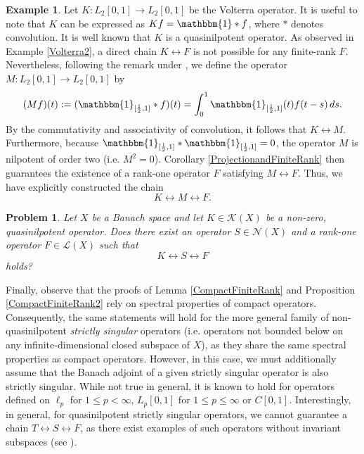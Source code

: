 \documentclass[a4paper,12pt]{article}
\newtheorem{problem}[thm]{Problem}
\theoremstyle{definition}
\newtheorem{example}[thm]{Example}
\numberwithin{equation}{section}
\numberwithin{thm}{section}
\begin{document}
\begin{example}
Let $K : L_2[0,1] \rightarrow L_2[0,1]$ be the Volterra operator. It is useful to note that $K$ can be expressed as $Kf = \mathbbm{1} \ast f$, where $\ast$ denotes convolution. It is well known that $K$ is a quasinilpotent operator. As observed in Example \ref{Volterra2}, a direct chain $K \leftrightarrow F$ is not possible for any finite-rank $F$. Nevertheless, following the remark under \cite[Lemma 2.6]{Ambrozie}, we define the operator $M : L_2[0,1] \rightarrow L_2[0,1]$ by
$$(Mf)(t) := (\mathbbm{1}_{[\frac{1}{2},1]} \ast f)(t) = \int_0^1 \mathbbm{1}_{[\frac{1}{2},1]}(t)f(t-s) \,ds.$$
By the commutativity and associativity of convolution, it follows that $K \leftrightarrow M$. Furthermore, because $\mathbbm{1}_{[\frac{1}{2},1]} \ast \mathbbm{1}_{[\frac{1}{2},1]} = 0$, the operator $M$ is nilpotent of order two (i.e. $M^2=0$). Corollary \ref{ProjectionandFiniteRank} then guarantees the existence of a rank-one operator $F$ satisfying $M \leftrightarrow F$. Thus, we have explicitly constructed the chain
$$K \leftrightarrow M \leftrightarrow F.$$
\end{example}

\begin{problem}
Let $X$ be a Banach space and let $K\in \mathcal{K}(X)$ be a non-zero, quasinilpotent operator. Does there exist an operator $S\in \mathcal{N}(X)$ and a rank-one operator $F\in \mathcal{L}(X)$ such that 
$$K\leftrightarrow S \leftrightarrow F$$
holds?
\end{problem}

Finally, observe that the proofs of Lemma \ref{CompactFiniteRank} and Proposition \ref{CompactFiniteRank2} rely on spectral properties of compact operators. Consequently, the same statements will hold for the more general family of non-quasinilpotent \textit{strictly singular} operators (i.e. operators not bounded below on any infinite-dimensional closed subspace of $X$), as they share the same spectral properties as compact operators. However, in this case, we must additionally assume that the Banach adjoint of a given strictly singular operator is also strictly singular. While not true in general, it is known to hold for operators defined on $\ell_p$ for $1\leq p<\infty$, $L_p[0,1]$ for $1\leq p\leq\infty$ or $C[0,1]$. Interestingly, in general, for quasinilpotent strictly singular operators, we cannot guarantee a chain $T \leftrightarrow S \leftrightarrow F$, as there exist examples of such operators without invariant subspaces (see \cite{Read1999StrictlySO}).
\end{document}
